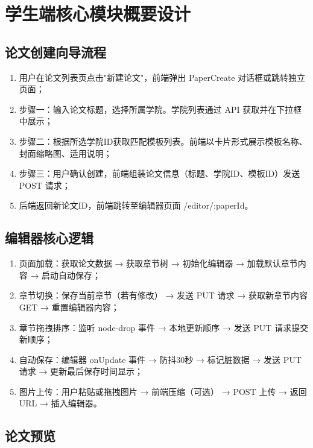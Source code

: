 \documentclass{../../softeng}
\begin{document}
\section{学生端核心模块概要设计}

\subsection{论文创建向导流程}

\begin{enumerate}
    \item 用户在论文列表页点击"新建论文"，前端弹出 PaperCreate 对话框或跳转独立页面；
    \item 步骤一：输入论文标题，选择所属学院。学院列表通过 API 获取并在下拉框中展示；
    \item 步骤二：根据所选学院ID获取匹配模板列表。前端以卡片形式展示模板名称、封面缩略图、适用说明；
    \item 步骤三：用户确认创建，前端组装论文信息（标题、学院ID、模板ID）发送 POST 请求；
    \item 后端返回新论文ID，前端跳转至编辑器页面 /editor/:paperId。
\end{enumerate}

\subsection{编辑器核心逻辑}

\begin{enumerate}
    \item 页面加载：获取论文数据 → 获取章节树 → 初始化编辑器 → 加载默认章节内容 → 启动自动保存；
    \item 章节切换：保存当前章节（若有修改） → 发送 PUT 请求 → 获取新章节内容 GET → 重置编辑器内容；
    \item 章节拖拽排序：监听 node-drop 事件 → 本地更新顺序 → 发送 PUT 请求提交新顺序；
    \item 自动保存：编辑器 onUpdate 事件 → 防抖30秒 → 标记脏数据 → 发送 PUT 请求 → 更新最后保存时间显示；
    \item 图片上传：用户粘贴或拖拽图片 → 前端压缩（可选） → POST 上传 → 返回URL → 插入编辑器。
\end{enumerate}

\subsection{论文预览}
\end{document}
